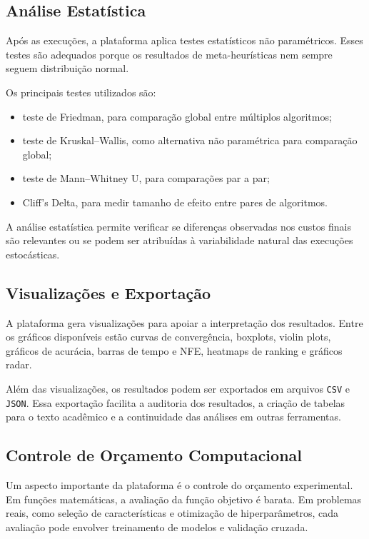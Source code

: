 \subsection{Análise Estatística}

Após as execuções, a plataforma aplica testes estatísticos não paramétricos. Esses testes são adequados porque os resultados de meta-heurísticas nem sempre seguem distribuição normal.

Os principais testes utilizados são:

\begin{itemize}
    \item teste de Friedman, para comparação global entre múltiplos algoritmos;
    \item teste de Kruskal--Wallis, como alternativa não paramétrica para comparação global;
    \item teste de Mann--Whitney U, para comparações par a par;
    \item Cliff's Delta, para medir tamanho de efeito entre pares de algoritmos.
\end{itemize}

A análise estatística permite verificar se diferenças observadas nos custos finais são relevantes ou se podem ser atribuídas à variabilidade natural das execuções estocásticas.

\subsection{Visualizações e Exportação}

A plataforma gera visualizações para apoiar a interpretação dos resultados. Entre os gráficos disponíveis estão curvas de convergência, boxplots, violin plots, gráficos de acurácia, barras de tempo e NFE, heatmaps de ranking e gráficos radar.

Além das visualizações, os resultados podem ser exportados em arquivos \texttt{CSV} e \texttt{JSON}. Essa exportação facilita a auditoria dos resultados, a criação de tabelas para o texto acadêmico e a continuidade das análises em outras ferramentas.

\subsection{Controle de Orçamento Computacional}

Um aspecto importante da plataforma é o controle do orçamento experimental. Em funções matemáticas, a avaliação da função objetivo é barata. Em problemas reais, como seleção de características e otimização de hiperparâmetros, cada avaliação pode envolver treinamento de modelos e validação cruzada.

